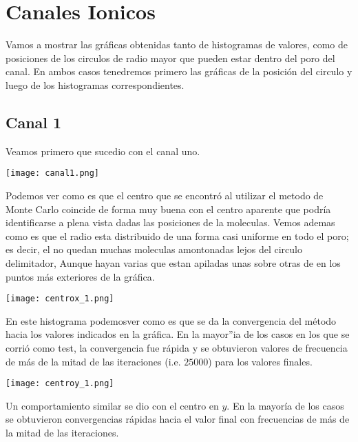 \documentclass[]{article}
\begin{document}
\section{Canales Ionicos}
Vamos a mostrar las gr\'aficas obtenidas tanto de histogramas de valores, como de posiciones de los circulos de radio mayor que pueden estar dentro del poro del canal. En ambos casos tenedremos primero las gr\'aficas de la posici\'on del circulo y luego de los histogramas correspondientes.\\
\subsection{Canal 1}
Veamos primero que sucedio con el canal uno.
\begin{center}
  \texttt{[image: canal1.png]}
\end{center}
Podemos ver como es que el centro que se encontr\'o al utilizar el metodo de Monte Carlo coincide de forma muy buena con el centro aparente que podr\'ia identificarse a plena vista dadas las posiciones de la moleculas. Vemos ademas como es que el radio esta distribuido de una forma casi uniforme en todo el poro; es decir, el no quedan muchas moleculas amontonadas lejos del circulo delimitador, Aunque hayan varias que estan apiladas unas sobre otras de en los puntos m\'as exteriores de la gr\'afica.
\begin{center}
  \texttt{[image: centrox\_1.png]}
\end{center}
En este histograma podemosver como es que se da la convergencia del m\'etodo hacia los valores indicados en la gr\'afica. En la mayor''ia de los casos en los que se corri\'o como test, la convergencia fue r\'apida y se obtuvieron valores de frecuencia de m\'as de la mitad de las iteraciones (i.e. $25000$) para los valores finales.
\begin{center}
  \texttt{[image: centroy\_1.png]}
\end{center}
Un comportamiento similar se dio con el centro en $y$. En la mayor\'ia de los casos se obtuvieron convergencias r\'apidas hacia el valor final con frecuencias de m\'as de la mitad de las iteraciones.
\end{document}
